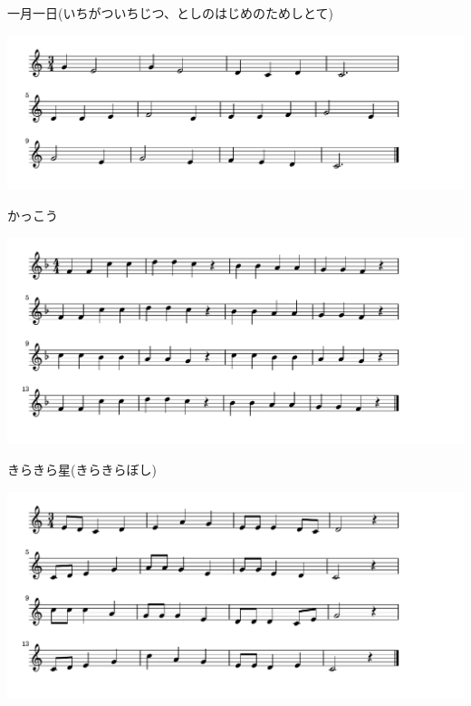 \documentclass[a4paper]{ltjsarticle}
\begin{document}
\vspace{-10mm} \hspace{10mm}
一月一日(いちがついちじつ、としのはじめのためしとて)



\includegraphics[clip]{kakkou_crop.pdf}

\vspace{-10mm} \hspace{10mm}
かっこう



\includegraphics[clip]{kirakira_crop.pdf}

\vspace{-10mm} \hspace{10mm}
きらきら星(きらきらぼし)



\includegraphics[clip]{koinobori_crop.pdf}
\end{document}
